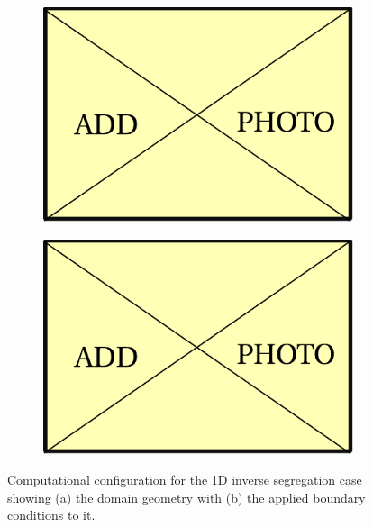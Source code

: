 %
\begin{figure}[htbp]
\centering
  \begin{subfigure}[t]{0.45\textwidth}
    \centering
	\includegraphics[width=\textwidth]{Misc/dummy.pdf}
	\caption{}
    \label{fig:1d_alsi7_geo}
  \end{subfigure}
   \begin{subfigure}[t]{0.45\textwidth}
    \centering
	\includegraphics[width=\textwidth]{Misc/dummy.pdf}
	\caption{}
    \label{fig:1d_alsi7_bc}
  \end{subfigure}
\caption{Computational configuration for the 1D inverse segregation case showing (a) the domain geometry with (b)
the applied boundary conditions to it. } 
\label{fig:1d_inverseseg_geo_bc}
\end{figure}
%
